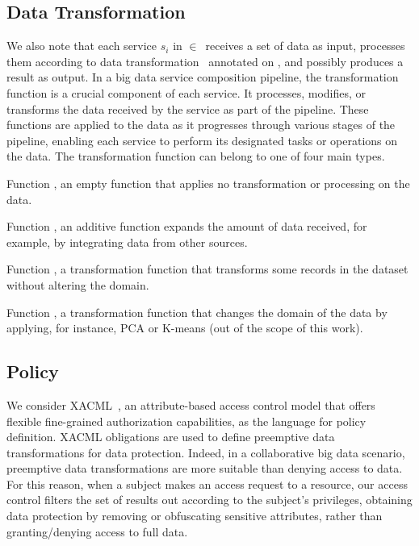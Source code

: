 \subsection{Data Transformation}
We also note that each service $s_i$ in $\in$\V\ receives a set of data as input, processes them according to data transformation \F\ annotated on , and possibly produces a result as output.
In a big data service composition pipeline, the transformation function is a crucial component of each service.
It processes, modifies, or transforms the data received by the service as part of the pipeline.
These functions are applied to the data as it progresses through various stages of the pipeline, enabling each service to perform its designated tasks or operations on the data.
The transformation function can belong to one of four main types.
\begin{enumerate*}[label=\roman*)]
  \item Function , an empty function that applies no transformation or processing on the data.
  \item Function , an additive function expands the amount of data received, for example, by integrating data from other sources.
  \item Function , a transformation function that transforms some records in the dataset without altering the domain.
  \item Function , a transformation function that changes the domain of the data by applying, for instance, PCA or K-means (out of the scope of this work).
\end{enumerate*}

\subsection{Policy}
We consider XACML~\cite{XACML}, an attribute-based access control model that offers flexible fine-grained authorization capabilities, as the language for policy definition. XACML obligations are used to define preemptive data transformations for data protection.
Indeed, in a collaborative big data scenario, preemptive data transformations are more suitable than denying access to data. For this reason, when a subject makes an access request to a resource, our access control filters the set of results out according to the subject's privileges, obtaining data protection by removing or obfuscating sensitive attributes, rather than granting/denying access to full data.

